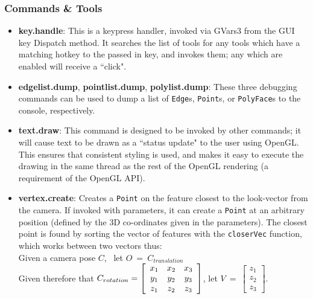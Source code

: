\documentclass[a4paper,10pt]{article}
\begin{document}
\begin{enumerate}
{}
\end{enumerate}

\subsubsection{Commands \& Tools}
\label{cmdTools}
\begin{itemize}
\item{\textbf{key.handle}: This is a keypress handler, invoked via GVars3 from the GUI key Dispatch method. It searches the list of tools for any tools which have a matching hotkey to the passed in key, and invokes them; any which are enabled will receive a ``click".}
\item{\textbf{edgelist.dump}, \textbf{pointlist.dump}, \textbf{polylist.dump}: These three debugging commands can be used to dump a list of \texttt{Edge}s, \texttt{Point}s, or \texttt{PolyFace}s to the console, respectively.}
\item{\textbf{text.draw}: This command is designed to be invoked by other commands; it will cause text to be drawn as a ``status update" to the user using OpenGL. This ensures that consistent styling is used, and makes it easy to execute the drawing in the same thread as the rest of the OpenGL rendering (a requirement of the OpenGL API).}
\item{\textbf{vertex.create}: Creates a \texttt{Point} on the feature closest to the look-vector from the camera. If invoked with parameters, it can create a \texttt{Point} at an arbitrary position (defined by the 3D co-ordinates given in the parameters). The closest point is found by sorting the vector of features with the \texttt{closerVec} function, which works between two vectors thus: 
\\

Given a camera pose $C$, ~let $O ~=~ C_{translation}$
\\

Given therefore that $C_{rotation} = \left[
  \begin{array}{c c c}
    x_1 & x_2 & x_3 \\
    y_1 & y_2 & y_3 \\
    z_1 & z_2 & z_3
  \end{array}\right]$, let $V ~=~ \left[ 
  \begin{array}{c}
    z_1 \\ 
    z_2 \\ 
    z_3 
  \end{array}\right]$.
\\ \\
  
}
\end{itemize}
\end{document}
